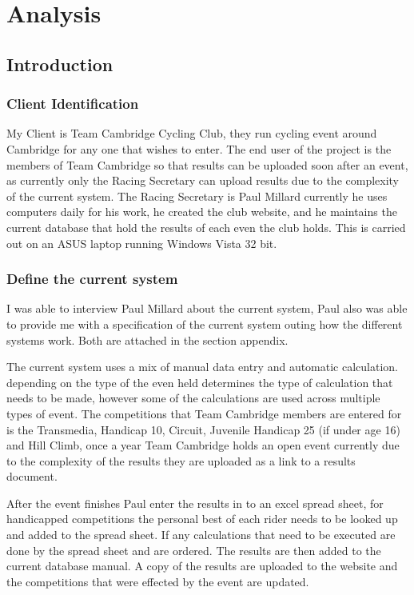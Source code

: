 \chapter{Analysis}

\section{Introduction}

\subsection{Client Identification}
My Client is Team Cambridge Cycling Club, they run cycling event around Cambridge for any one that wishes to enter. The end user of the project is the members of Team Cambridge so that results can be uploaded soon after an event, as currently only the Racing Secretary can upload results due to the complexity of the current system. The Racing Secretary is Paul Millard currently he uses computers daily for his work, he created the club website, and he maintains the current database that hold the results of each even the club holds. This is carried out on an ASUS laptop running Windows Vista 32 bit.
\subsection{Define the current system}
I was able to interview Paul Millard about the current system, Paul also was able to provide me with a specification of the current system outing how the different systems work. Both are attached in the section appendix.

The current system uses a mix of manual data entry and automatic calculation. depending on the type of the even held determines the type of calculation that needs to be made, however some of the calculations are used across multiple types of event. The competitions that Team Cambridge members are entered for is the Transmedia, Handicap 10, Circuit, Juvenile Handicap 25 (if under age 16) and Hill Climb, once a year Team Cambridge holds an open event currently due to the complexity of the results they are uploaded as a link to a  results document. 

After the event finishes Paul enter the results in to an excel spread sheet, for handicapped competitions the personal best of each rider needs to be looked up and added to the spread sheet. If any calculations that need to be executed are done by the spread sheet and are ordered. The results are then added to the current database manual. A copy of the results are uploaded to the website and the competitions that were effected by the event are updated.

